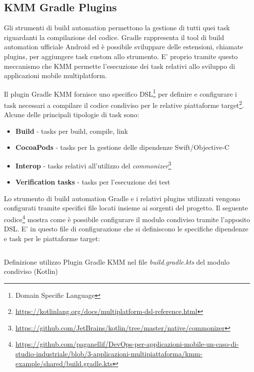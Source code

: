 \subsection{KMM Gradle Plugins}
Gli strumenti di build automation permettono la gestione di tutti quei task riguardanti la compilazione del codice. Gradle rappresenta il tool di build automation ufficiale Android ed è possibile sviluppare delle estensioni, chiamate plugins, per aggiungere task custom allo strumento. E' proprio tramite questo meccanismo che KMM permette l'esecuzione dei task relativi allo sviluppo di applicazioni mobile multiplatform.

Il plugin Gradle KMM fornisce uno specifico DSL\footnote{Domain Specific Language} per definire e configurare i task necessari a compilare il codice condiviso per le relative piattaforme target\footnote{\href{https://kotlinlang.org/docs/multiplatform-dsl-reference.html}{https://kotlinlang.org/docs/multiplatform-dsl-reference.html}}. Alcune delle principali tipologie di task sono:

\begin{itemize}
    \item \textbf{Build} - tasks per build, compile, link
    \item \textbf{CocoaPods} - tasks per la gestione delle dipendenze Swift/Objective-C
    \item \textbf{Interop} - tasks relativi all'utilizzo del \textit{commonizer}\footnote{\href{https://github.com/JetBrains/kotlin/tree/master/native/commonizer}{https://github.com/JetBrains/kotlin/tree/master/native/commonizer}}
    \item \textbf{Verification tasks} - tasks per l'esecuzione dei test
\end{itemize}

Lo strumento di build automation Gradle e i relativi plugins utilizzati vengono configurati tramite specifici file locati insieme ai sorgenti del progetto. Il seguente codice\footnote{\href{https://github.com/paganellif/DevOps-per-applicazioni-mobile-un-caso-di-studio-industriale/blob/3-applicazioni-multipiattaforma/kmm-example/shared/build.gradle.kts}{https://github.com/paganellif/DevOps-per-applicazioni-mobile-un-caso-di-studio-industriale/blob/3-applicazioni-multipiattaforma/kmm-example/shared/build.gradle.kts}} mostra come è possibile configurare il modulo condiviso tramite l'apposito DSL. E' in questo file di configurazione che si definiscono le specifiche dipendenze e task per le piattaforme target:

\begin{listing}[H]
\inputminted{kotlin}{code/build.gradle.kts}
\caption{Definizione utilizzo Plugin Gradle KMM nel file \textit{build.gradle.kts} del modulo condiviso (Kotlin)}
\end{listing}

